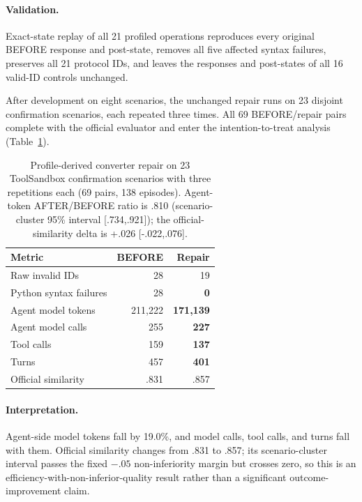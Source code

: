 \documentclass[letterpaper]{article}
\begin{document}
\paragraph{Validation.}
Exact-state replay of all 21 profiled operations reproduces every original
BEFORE response and post-state, removes all five affected syntax failures,
preserves all 21 protocol IDs, and leaves the responses and post-states of all
16 valid-ID controls unchanged.

After development on eight scenarios, the unchanged repair runs on 23 disjoint
confirmation scenarios, each repeated three times. All 69 BEFORE/repair pairs
complete with the official evaluator and enter the intention-to-treat analysis
(Table~\ref{tab:rq2-repair}).

\begin{table}[h]
\centering\small
\setlength{\tabcolsep}{4pt}
\begin{tabular}{@{}lrr@{}}
\toprule
Metric & BEFORE & Repair \\
\midrule
Raw invalid IDs & 28 & 19 \\
Python syntax failures & 28 & \textbf{0} \\
Agent model tokens & 211{,}222 & \textbf{171{,}139} \\
Agent model calls & 255 & \textbf{227} \\
Tool calls & 159 & \textbf{137} \\
Turns & 457 & \textbf{401} \\
Official similarity & .831 & .857 \\
\bottomrule
\end{tabular}
\caption{Profile-derived converter repair on 23 ToolSandbox confirmation
scenarios with three repetitions each (69 pairs, 138 episodes). Agent-token
AFTER/BEFORE ratio is .810 (scenario-cluster 95\% interval [.734,.921]); the
official-similarity delta is +.026 [-.022,.076].}
\label{tab:rq2-repair}
\end{table}

\paragraph{Interpretation.}
Agent-side model tokens fall by 19.0\%, and model calls, tool calls, and turns
fall with them. Official similarity changes from .831 to .857; its
scenario-cluster interval passes the fixed $-.05$ non-inferiority margin but
crosses zero, so this is an efficiency-with-non-inferior-quality result rather
than a significant outcome-improvement claim.
\end{document}
